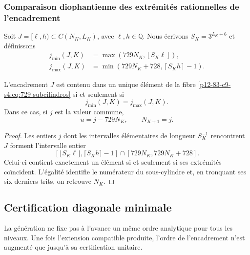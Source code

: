 \subsubsection{Comparaison diophantienne des extrémités rationnelles de l'encadrement}

Soit \(J=[\ell,h)\subset C(N_K,L_K)\), avec
\(\ell,h\in\mathbb Q\). Nous écrivons \(S_K=3^{L_K+6}\) et définissons
\begin{align}
 j_{\min}(J,K)
 &=\max\!\left(729N_K,\left\lfloor S_K\ell\right\rfloor\right),
 \label{p12-83-c9-s4:eq:jmin-diagonal}\\
 j_{\max}(J,K)
 &=\min\!\left(729N_K+728,\left\lceil S_Kh\right\rceil-1\right).
 \label{p12-83-c9-s4:eq:jmax-diagonal}
\end{align}

\begin{lemma}
\label{p12-83-c9-s4:lem:criterio-localizacion-unitaria}
L’encadrement \(J\) est contenu dans un unique élément de la fibre
\eqref{p12-83-c9-s4:eq:729-subcilindros} si et seulement si
\begin{equation}
 \boxed{j_{\min}(J,K)=j_{\max}(J,K).}
 \label{p12-83-c9-s4:eq:jmin-igual-jmax}
\end{equation}
Dans ce cas, si \(j\) est la valeur commune,
\[
 u=j-729N_K,
 \qquad
 N_{K+1}=j.
\]
\end{lemma}

\begin{proof}
Les entiers \(j\) dont les intervalles élémentaires de longueur \(S_K^{-1}\)
rencontrent \(J\) forment l’intervalle entier
\[
 \left[
 \lfloor S_K\ell\rfloor,
 \lceil S_Kh\rceil-1
 \right]\cap
 [729N_K,729N_K+728].
\]
Celui-ci contient exactement un élément si et seulement si ses extrémités coïncident.
L’égalité identifie le numérateur du sous-cylindre et, en tronquant ses six
derniers trits, on retrouve \(N_K\).
\end{proof}

\subsection{Certification diagonale minimale}

La génération ne fixe pas à l’avance un même ordre analytique pour tous les
niveaux. Une fois l’extension compatible produite, l’ordre de
l’encadrement n’est augmenté que jusqu’à sa certification unitaire.

